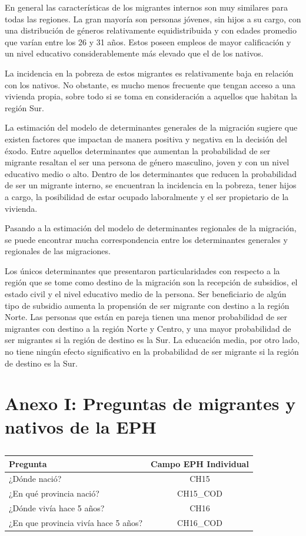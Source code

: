 \documentclass[12pt,a4paper]{article}
\begin{document}
En general las características de los migrantes internos son muy similares para todas las regiones. La gran mayoría son personas jóvenes, sin hijos a su cargo, con una distribución de géneros relativamente equidistribuida y con edades promedio que varían entre los 26 y 31 años. Estos poseen empleos de mayor calificación y un nivel educativo considerablemente más elevado que el de los nativos. 

La incidencia en la pobreza de estos migrantes es relativamente baja en relación con los nativos. No obstante, es mucho menos frecuente que tengan acceso a una vivienda propia, sobre todo si se toma en consideración a aquellos que habitan la región Sur.

La estimación del modelo de determinantes generales de la migración sugiere que existen factores que impactan de manera positiva y negativa en la decisión del éxodo.  Entre aquellos determinantes que aumentan la probabilidad de ser migrante resaltan el ser una persona de género masculino, joven y con un nivel educativo medio o alto. Dentro de los determinantes que reducen la probabilidad de ser un migrante interno, se encuentran la incidencia en la pobreza, tener hijos a cargo, la posibilidad de estar ocupado laboralmente y el ser propietario de la vivienda. 

Pasando a la estimación del modelo de determinantes regionales de la migración, se puede encontrar mucha correspondencia entre los determinantes generales y regionales de las migraciones.

Los únicos determinantes que presentaron particularidades con respecto a la región que se tome como destino de la migración son la recepción de subsidios, el estado civil y el nivel educativo medio de la persona. Ser beneficiario de algún tipo de subsidio aumenta la propensión de ser migrante con destino a la región Norte. Las personas que están en pareja tienen una menor probabilidad de ser migrantes con destino a la región Norte y Centro, y una mayor probabilidad de ser migrantes si la región de destino es la Sur. La educación media, por otro lado, no tiene ningún efecto significativo en la probabilidad de ser migrante si la región de destino es la Sur.

\newpage
\appendix
\clearpage
\addappheadtotoc
\appendixpage
\section{Anexo I: Preguntas de migrantes y nativos de la EPH}
\begin{table}[!htbp]
\caption{}
\centering
\begin{tabular}{lc}
\hline
\hline
Pregunta                             & Campo EPH Individual \\ \hline
¿Dónde nació?                        & CH15                 \\
¿En qué provincia nació?             & CH15\_COD            \\
¿Dónde vivía hace 5 años?            & CH16                 \\
¿En que provincia vivía hace 5 años? & CH16\_COD            \\ \hline
\end{tabular}
\end{table}
\end{document}
